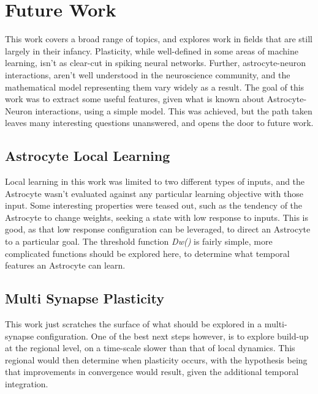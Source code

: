 %

\chapter{Future Work} \label{chapter:future-work}
This work covers a broad range of topics, and explores work in fields that are
still largely in their infancy. Plasticity, while well-defined in some areas of
machine learning, isn't as clear-cut in spiking neural networks. Further,
astrocyte-neuron interactions, aren't well understood in the neuroscience
community, and the mathematical model representing them vary widely as a
result. The goal of this work was to extract some useful features, given what is
known about Astrocyte-Neuron interactions, using a simple model. This was
achieved, but the path taken leaves many interesting questions unanswered, and
opens the door to future work.

\section{Astrocyte Local Learning}
Local learning in this work was limited to two different types of inputs, and
the Astrocyte wasn't evaluated against any particular learning objective with
those input. Some interesting properties were teased out, such as the tendency of
the Astrocyte to change weights, seeking a state with low \ca response to
inputs. This is good, as that low \ca response configuration can be leveraged,
to direct an Astrocyte to a particular goal. The threshold function
\emph{Dw(\ca)} is fairly simple, more complicated functions should be explored
here, to determine what temporal features an Astrocyte can learn.

\section{Multi Synapse Plasticity}
This work just scratches the surface of what should be explored in a
multi-synapse configuration. One of the best next steps however, is to explore
\ca build-up at the regional level, on a time-scale slower than that of local
dynamics. This regional \ca would then determine when plasticity occurs, with
the hypothesis being that improvements in convergence would result, given the
additional temporal integration. 

